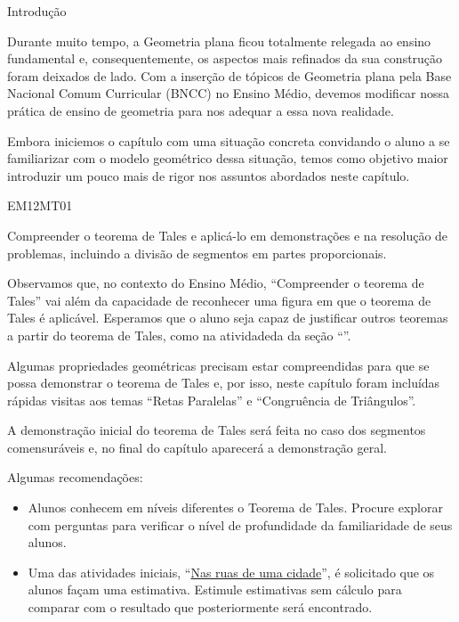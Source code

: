 \begin{apresentacao}{Introdução}


Durante muito tempo, a Geometria plana ficou totalmente relegada ao ensino fundamental e, consequentemente, os aspectos mais refinados da sua construção foram deixados de lado. Com a inserção de tópicos de Geometria plana pela Base Nacional Comum Curricular (BNCC) no Ensino Médio, devemos modificar nossa prática de ensino de geometria para nos adequar a  essa nova realidade.


Embora iniciemos o capítulo com uma situação concreta convidando o aluno a se familiarizar com o modelo geométrico dessa situação, temos como objetivo maior introduzir um pouco mais de rigor nos assuntos abordados neste capítulo.


\begin{habilities}{EM12MT01}

Compreender o teorema de Tales e aplicá-lo em demonstrações e na resolução de problemas, incluindo a divisão de segmentos em partes proporcionais.
\end{habilities}

Observamos que, no contexto do Ensino Médio, “Compreender o teorema de Tales” vai além da capacidade de reconhecer uma figura em que o teorema de Tales é aplicável. Esperamos que o aluno seja capaz de justificar outros teoremas a partir do teorema de Tales, como na atividadeda da seção “”.

Algumas propriedades geométricas precisam estar compreendidas para que se possa demonstrar o teorema de Tales e, por isso, neste capítulo foram incluídas rápidas visitas aos temas “Retas Paralelas” e “Congruência de Triângulos”.

A demonstração inicial do teorema de Tales será feita no caso dos segmentos comensuráveis e, no final do capítulo aparecerá a demonstração geral.

Algumas recomendações:
\begin{itemize}
\item {} 
Alunos conhecem em níveis diferentes o Teorema de Tales. Procure explorar com perguntas para verificar o nível de profundidade da familiaridade de seus alunos.

\item {} 
Uma das atividades iniciais, ``\hyperref[nas-ruas]{Nas ruas de uma cidade}”, é solicitado que os alunos façam uma estimativa. Estimule estimativas sem cálculo para comparar com o resultado que posteriormente será encontrado.


\end{itemize}
\end{apresentacao}
